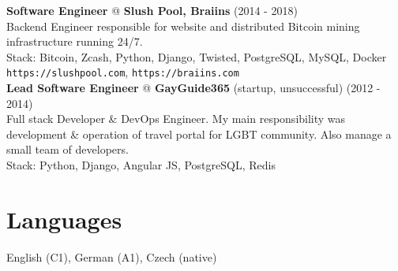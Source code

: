 \documentclass[12pt,a4paper]{article}
\begin{document}
{\bf Software Engineer} @ {\bf Slush Pool, Braiins} (2014 - 2018)\\
Backend Engineer responsible for website and distributed Bitcoin mining infrastructure running 24/7.\\
Stack: Bitcoin, Zcash, Python, Django, Twisted, PostgreSQL, MySQL, Docker\\
\texttt{https://slushpool.com}, \texttt{https://braiins.com}\\

{\bf Lead Software Engineer} @ {\bf GayGuide365} (startup, unsuccessful) (2012 - 2014)\\
Full stack Developer \& DevOps Engineer. My main responsibility was development \& operation of travel portal for LGBT community. Also manage a small team of developers.\\
Stack: Python, Django, Angular JS, PostgreSQL, Redis\\

\section*{Languages}

English (C1), German (A1), Czech (native)\\
\end{document}
